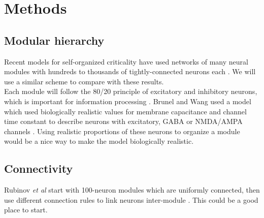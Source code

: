 \documentclass[a4paper, 12pt]{article}
\begin{document}

\section*{Methods}

\subsection*{Modular hierarchy}

Recent models for self-organized criticality have used networks of many neural modules with hundreds to thousands of tightly-connected neurons each \cite{munozlg, rubinov}. We will use a similar scheme to compare with these results.\\

Each module will follow the 80/20 principle of excitatory and inhibitory neurons, which is important for information processing \cite{larremorerestrepo, entropyinhibition}. Brunel and Wang used a model which used biologically realistic values for membrane capacitance and channel time constant to describe neurons with excitatory, GABA or NMDA/AMPA channels \cite{objectworkingmemory}. Using realistic proportions of these neurons to organize a module would be a nice way to make the model biologically realistic.\\

\subsection*{Connectivity}
Rubinov \textit{et al} start with 100-neuron modules which are uniformly connected, then use different connection rules to link neurons inter-module \cite{rubinov}. This could be a good place to start.\\
\end{document}
